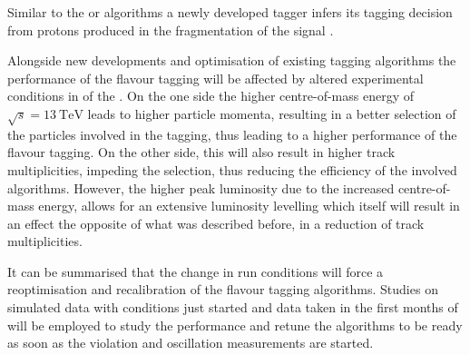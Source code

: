 Similar to the \SSpi or \SSK algorithms a newly developed \SSp tagger infers
its tagging decision from protons produced in the fragmentation of the signal
\Bmeson. 

Alongside new developments and optimisation of existing tagging algorithms the
performance of the flavour tagging will be affected by altered experimental
conditions in \RunTwo of the \LHC. On the one side the higher centre-of-mass
energy of $\sqrt{s}=\SI{13}{\TeV}$ leads to higher particle momenta, resulting
in a better selection of the particles involved in the tagging, thus leading to
a higher performance of the flavour tagging. On the other side, this will also
result in higher track multiplicities, impeding the selection, thus reducing the
efficiency of the involved algorithms. However, the higher peak luminosity due
to the increased centre-of-mass energy, allows for an extensive luminosity
levelling which itself will result in an effect the opposite of what was
described before, in a reduction of track multiplicities.

It can be summarised that the change in run conditions will force a
reoptimisation and recalibration of the flavour tagging algorithms. Studies on
\MC simulated data with \RunTwo conditions just started and data taken in the
first months of \RunTwo will be employed to study the performance and retune the
algorithms to be ready as soon as the \CP violation and \B oscillation
measurements are started.




